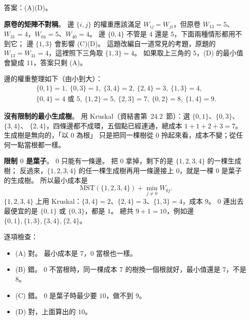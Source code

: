 \begin{pastsoln}
答案：(A)(D)。

\textbf{原卷的矩陣不對稱}。 邊 $\{i, j\}$ 的權重應該滿足 $W_{ij} = W_{ji}$，但原卷 $W_{13} = 5$、
$W_{31} = 4$，$W_{04} = 5$、$W_{40} = 4$。 邊 $\{0, 4\}$ 不管是 $4$ 還是 $5$，下面兩種情形都用不到它；
邊 $\{1, 3\}$ 會影響 (C)(D)。 這題改編自一道常見的考題，原題的 $W_{13} = W_{31} = 4$，這裡照下三角取
$\{1, 3\} = 4$。 如果取上三角的 $5$，(D) 的最小值會變成 $11$，答案只剩 (A)。

邊的權重整理如下（由小到大）：
\[
\begin{gathered}
\{0,1\} = 1,\ \{0,3\} = 1,\ \{3,4\} = 2,\ \{2,4\} = 3,\ \{1,3\} = 4, \\
\{0,4\} = 4\text{ 或 }5,\ \{1,2\} = 5,\ \{2,3\} = 7,\ \{0,2\} = 8,\ \{1,4\} = 9 .
\end{gathered}
\]

\textbf{沒有限制的最小生成樹}。 用 Kruskal（資結書第~24.2~節）：選 $\{0,1\}$、$\{0,3\}$、$\{3,4\}$、
$\{2,4\}$，四條邊都不成環，五個點已經連通，總成本 $1 + 1 + 2 + 3 = 7$。 生成樹是無向的，「以 $0$ 為根」
只是把同一棵樹從 $0$ 拎起來看，成本不變；從任何一點當根都一樣。

\textbf{限制 $0$ 是葉子}。 $0$ 只能有一條邊。 把 $0$ 拿掉，剩下的是 $\{1, 2, 3, 4\}$ 的一棵生成樹；
反過來，$\{1, 2, 3, 4\}$ 的任一棵生成樹再用一條邊接上 $0$，就是一棵 $0$ 是葉子的生成樹。 所以最小成本是
\[
\text{MST}(\{1,2,3,4\}) + \min_{j \ne 0} W_{0j} .
\]
$\{1, 2, 3, 4\}$ 上用 Kruskal：$\{3,4\} = 2$、$\{2,4\} = 3$、$\{1,3\} = 4$，成本 $9$。 $0$ 連出去最便宜的是
$\{0,1\}$ 或 $\{0,3\}$，都是 $1$。 總共 $9 + 1 = 10$，例如邊 $\{0,1\}, \{1,3\}, \{3,4\}, \{2,4\}$。

逐項檢查：
\begin{itemize}
\item (A) 對。 最小成本是 $7$，$0$ 當根也一樣。
\item (B) 錯。 $0$ 不當根時，同一棵成本 $7$ 的樹換一個根就好，最小值還是 $7$，不是 $8$。
\item (C) 錯。 $0$ 是葉子時最少要 $10$，做不到 $9$。
\item (D) 對，上面算出的 $10$。
\end{itemize}
\end{pastsoln}
